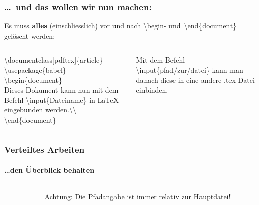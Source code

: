 \begin{frame}
\frametitle{\ldots ~und das wollen wir nun machen:}
Es muss \textbf{alles} (einschliesslich) vor und nach \color{unibablueI}\textbackslash begin\color{black}- 
und\color{unibablueI}~\textbackslash end\color{black}\{document\} gel\"oscht werden:\\[5mm]
\begin{columns}
\begin{column}{.47\textwidth}
\sout{\color{nounibaredI}\color{nounibaredI}\textbackslash documentclass\color{black}\color{nounibagreenI}[pdftex]\color{black}\{article\} \\
\color{nounibaredI}\textbackslash usepackage\color{black}\{babel\}\\
\color{nounibaredI}\color{unibablueI}\textbackslash\color{unibablueI}begin\color{black}\color{black}\{document\} }\\
Dieses Dokument kann nun mit dem Befehl \color{nounibaredI}\color{nounibaredI}\textbackslash input\color{nounibaredI}\color{black}\{Dateiname\} in LaTeX eingebunden werden.\color{nounibaredI}\color{nounibaredI}\textbackslash \color{nounibaredI}\textbackslash \color{black}  \\
\sout{\color{nounibaredI}\color{unibablueI}\textbackslash\color{unibablueI}end\color{black}\color{black}\{document\} }
\end{column}
\begin{column}{.47\textwidth}
Mit dem Befehl \color{nounibaredI}\textbackslash input\color{black}\{pfad/zur/datei\} kann man danach
 diese in eine andere {\ttfamily .tex}-Datei einbinden. 

\end{column}
\end{columns}
\end{frame}

\begin{frame}
\frametitle{Verteiltes Arbeiten}
\framesubtitle{\ldots den \"Uberblick behalten}
\begin{columns}{2}
\begin{column}{.6\textwidth}
\end{column}
\begin{column}{.3\textwidth}
\begin{alertblock}{Achtung:}
Die Pfadangabe ist immer relativ zur Hauptdatei!
\end{alertblock}
\end{column}
\end{columns}

\end{frame}


